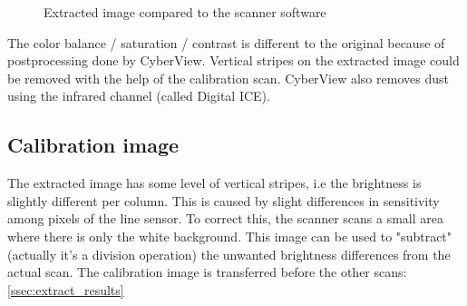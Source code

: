 \documentclass{article}
\begin{document}
\begin{figure}[H]
    \centering
    
    \caption{Extracted image compared to the scanner software}
\end{figure}

The color balance / saturation / contrast is different to the original because of postprocessing
done by CyberView. Vertical stripes on the extracted image could be removed with
the help of the calibration scan.
CyberView also removes dust using the infrared channel (called Digital ICE).

\subsection{Calibration image}
\label{ssec:calibration}

The extracted image has some level of vertical stripes, i.e the brightness is
slightly different per column. This is caused by slight differences in sensitivity
among pixels of the line sensor.
To correct this, the scanner scans a small area where there is only the white background.
This image can be used to "subtract" (actually it's a division operation) the unwanted
brightness differences from the actual scan.
The calibration image is transferred before the other scans: \ref{ssec:extract_results}
\end{document}
